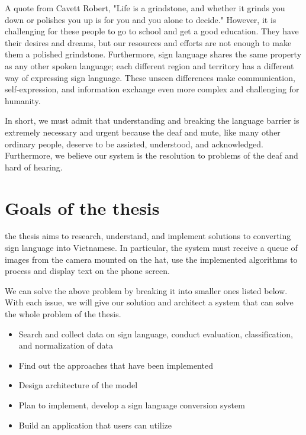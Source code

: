 A quote from Cavett Robert, "Life is a grindstone, and whether it grinds you down or polishes you up is for you and you alone to decide." However, it is challenging for these people to go to school and get a good education. They have their desires and dreams, but our resources and efforts are not enough to make them a polished grindstone. Furthermore, sign language shares the same property as any other spoken language; each different region and territory has a different way of expressing sign language. These unseen differences make communication, self-expression, and information exchange even more complex and challenging for humanity.

In short, we must admit that understanding and breaking the language barrier is extremely necessary and urgent because the deaf and mute, like many other ordinary people, deserve to be assisted, understood, and acknowledged. Furthermore, we believe our system is the resolution to problems of the deaf and hard of hearing.

\section{Goals of the thesis}

% 

the thesis aims to research, understand, and implement solutions to converting sign language into Vietnamese. In particular, the system must receive a queue of images from the camera mounted on the hat, use the implemented algorithms to process and display text on the phone screen.

We can solve the above problem by breaking it into smaller ones listed below. With each issue, we will give our solution and architect a system that can solve the whole problem of the thesis.
 
\begin{itemize}
	\item Search and collect data on sign language, conduct evaluation, classification, and normalization of data
	\item Find out the approaches that have been implemented
	\item Design architecture of the model
	\item Plan to implement, develop a sign language conversion system
	\item Build an application that users can utilize
\end{itemize}


